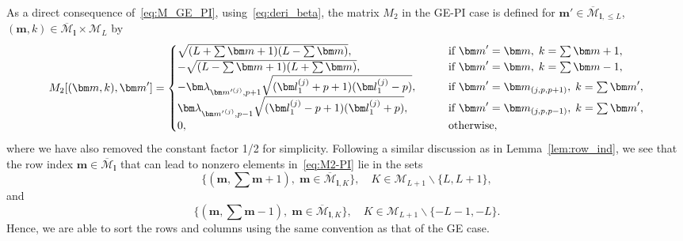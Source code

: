 \documentclass{article}
\newcommand{\blamb}[2]{\bm\lambda^{#1}_{#2}}
\numberwithin{equation}{section}
\def\bl{{\bm l}}
\def\bbm{{\bm m}}
\def\calM{\mathcal{M}}
\def\oMl{\overline{\calM}_\bl}
\def\MlL{{M}}
\begin{document}
As a direct consequence of~\eqref{eq:M_GE_PI}, using~\eqref{eq:deri_beta}, the matrix $\MlL_2$ in the GE-PI case is defined for $\bbm'\in \overline{\calM}_{\bl,\le L}$, $(\bbm,k)\in \oMl\times\calM_L$ by
\begin{equation}
        \MlL_2[(\bbm,k),\bbm'] = 
    \begin{cases}
        \sqrt{(L+\sum\bbm+1)(L-\sum\bbm)}, & \qquad  \textup{if }\bbm'=\bbm,\; k = \sum\bbm+1, \\
        -\sqrt{(L-\sum\bbm+1)(L+\sum\bbm)}, & \qquad  \textup{if }\bbm'=\bbm,\; k = \sum\bbm-1, \\
        -\blamb{}{\bbm'^{(j)},p+1}\sqrt{(\bl^{(j)}_1+p+1)(\bl^{(j)}_1-p)}, & \qquad \textup{if }\bbm' = \bbm_{(j,p,p+1)}, \; k = \sum\bbm', \\
        \blamb{}{{\bbm'}^{(j)},p-1}\sqrt{(\bl^{(j)}_1-p+1)(\bl^{(j)}_1+p)}, & \qquad \textup{if }\bbm' = \bbm_{(j,p,p-1)}, \;  k = \sum\bbm', \\
        0, & \qquad \textup{otherwise},
    \end{cases}
    \label{eq:M2-PI}
\end{equation}
where we have also removed the constant factor 1/2 for simplicity.
Following a similar discussion as in Lemma~\ref{lem:row_ind}, we see that the row index $\bbm\in\oMl$ that can lead to nonzero elements in~\eqref{eq:M2-PI} lie in the sets 
\[
\big\{ (\bbm, {\sum}\bbm+1), \;  \bbm \in \overline{\calM}_{\bl,K} \big\},
\quad K \in \calM_{L+1} \backslash \{ L, L+1\},
\]
and 
\[
\big\{ (\bbm, {\sum} \bbm-1), 
\; \bbm \in \overline{\calM}_{\bl,K} \big\},
\quad K \in \calM_{L+1} \backslash \{ -L-1, -L\}.
\]
Hence, we are able to sort the rows and columns using the same convention as that of the GE case. 
\end{document}
